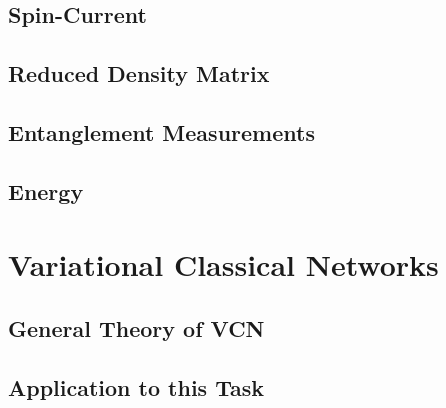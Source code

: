 \documentclass[
headings=optiontohead,              %
12pt,                               %
DIV=13,                             %
twoside=false,                      %
open=right,                         %
BCOR=00mm,                          %
toc=bibliographynumbered            %
]{scrreport}
\begin{document}
        \subsection{Spin-Current}
        \label{sec:theory-observables-current}
        
        \FloatBarrier

        \subsection{Reduced Density Matrix}
        \label{sec:theory-observables-density-matrix}
        
        \FloatBarrier
        
        \subsection{Entanglement Measurements}
        \label{sec:theory-observables-entanglement}
        
        \FloatBarrier
        
        \subsection{Energy}
        \label{sec:theory-observables-energy}
        
        \FloatBarrier

    \section{Variational Classical Networks}
    \label{sec:theory-variational-classical-networks}
    
    \FloatBarrier
        
        \subsection{General Theory of VCN}
        \label{sec:theory-variational-classical-networks-basics}
        
        \FloatBarrier


        \subsection{Application to this Task}
        \label{sec:theory-variational-classical-networks-application}
        
        \FloatBarrier
\end{document}
